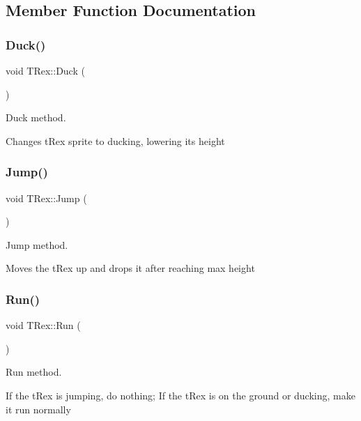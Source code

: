 \subsection{Member Function Documentation}
\mbox{\label{class_t_rex_a1e672bcdbbeab5bc66c1812e3be30fd3}} 
\subsubsection{\texorpdfstring{Duck()}{Duck()}}
{\footnotesize\ttfamily void T\+Rex\+::\+Duck (\begin{DoxyParamCaption}{ }\end{DoxyParamCaption})}



Duck method. 

Changes t\+Rex sprite to ducking, lowering its height \mbox{\label{class_t_rex_abc238b8e1df77d79f259cadd3a6c4cc8}} 
\subsubsection{\texorpdfstring{Jump()}{Jump()}}
{\footnotesize\ttfamily void T\+Rex\+::\+Jump (\begin{DoxyParamCaption}{ }\end{DoxyParamCaption})}



Jump method. 

Moves the t\+Rex up and drops it after reaching max height \mbox{\label{class_t_rex_af0e9ccbecc23739201a85e489da81efd}} 
\subsubsection{\texorpdfstring{Run()}{Run()}}
{\footnotesize\ttfamily void T\+Rex\+::\+Run (\begin{DoxyParamCaption}{ }\end{DoxyParamCaption})}



Run method. 

If the t\+Rex is jumping, do nothing; If the t\+Rex is on the ground or ducking, make it run normally \mbox{\label{class_t_rex_aaef538213b79fb870e8af8f0cdf39a14}} 
